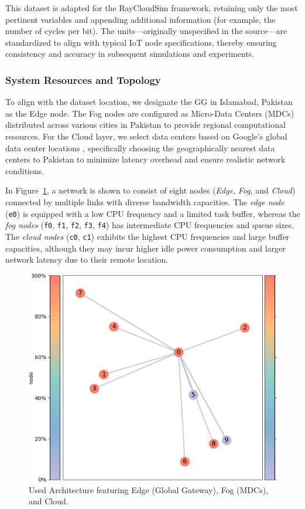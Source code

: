 \documentclass{svproc}
\begin{document}
This dataset is adapted for the RayCloudSim framework, retaining only the most pertinent variables and appending additional information (for example, the number of cycles per bit). The units—originally unspecified in the source—are standardized to align with typical IoT node specifications, thereby ensuring consistency and accuracy in subsequent simulations and experiments.

\subsubsection{System Resources and Topology}\label{subsec:system_resources_topology}

To align with the dataset location, we designate the GG in Islamabad, Pakistan as the Edge node. The Fog nodes are configured as Micro-Data Centers (MDCs) distributed across various cities in Pakistan to provide regional computational resources. For the Cloud layer, we select data centers based on Google's global data center locations \cite{googleDataCenters}, specifically choosing the geographically nearest data centers to Pakistan to minimize latency overhead and ensure realistic network conditions.


In Figure~\ref{fig:used_architecture}, a network is shown to consist of eight nodes (\textit{Edge}, \textit{Fog}, and \textit{Cloud}) connected by multiple links with diverse bandwidth capacities. The \textit{edge node} (\texttt{e0}) is equipped with a low CPU frequency and a limited task buffer, whereas the \textit{fog nodes} (\texttt{f0}, \texttt{f1}, \texttt{f2}, \texttt{f3}, \texttt{f4}) has intermediate CPU frequencies and queue sizes. The \textit{cloud nodes} (\texttt{c0}, \texttt{c1}) exhibits the highest CPU frequencies and large buffer capacities, although they may incur higher idle power consumption and larger network latency due to their remote location.

\begin{figure}[H]
    \centering
    \includegraphics[width=0.75\linewidth]{figs/used_architecture.png}
    \caption{Used Architecture featuring Edge (Global Gateway), Fog (MDCs), and Cloud.}\label{fig:used_architecture}
\end{figure}
\end{document}
